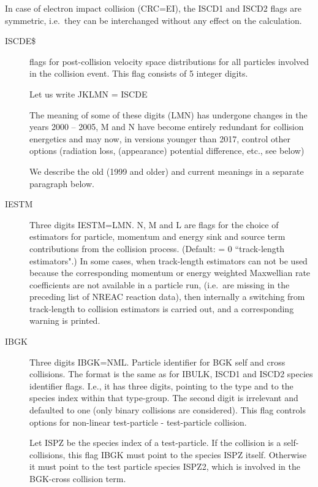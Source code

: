 In case of  electron impact collision (CRC=EI), the ISCD1 and ISCD2 flags are
symmetric, i.e.\ they can be interchanged without any effect on the
calculation.
\begin{description}
  \item[ISCDE\$] flags for post-collision velocity space distributions for all
        particles involved in the collision event.
        This flag consists of 5 integer digits.

        Let us write JKLMN = ISCDE 

        The meaning of some of these digits (LMN) has undergone changes in the years
        2000 -- 2005, M and N have become entirely redundant for collision energetics
        and may now, in versions younger than 2017, control other options (radiation
        loss, (appearance) potential difference, etc., see below) 

        We describe the old (1999 and older) and current meanings in a separate
        paragraph below.

  \item[IESTM] Three digits IESTM=LMN.
        N, M and L are flags for the choice of estimators for particle, momentum and
        energy sink and source term contributions from the collision process.
        (Default: = 0 ``track-length estimators".)
        In some cases, when track-length estimators can not be used because the
        corresponding momentum or energy weighted Maxwellian rate coefficients are not
        available in a particle run, (i.e.\ are missing in the preceding list of NREAC
        reaction data), then internally a switching from track-length to collision
        estimators is carried out, and a corresponding warning is printed.
  \item[IBGK] 

        Three digits IBGK=NML.
        Particle identifier for \ac{BGK} self and cross collisions.
        The format is the same as for IBULK, ISCD1 and ISCD2 species identifier flags.
        I.e., it has three digits, pointing to the type and to the species index within
        that type-group.
        The second digit is irrelevant and defaulted to one (only binary collisions are
        considered).
        This flag controls options for non-linear test-particle - test-particle
        collision.

        Let ISPZ be the species index of a test-particle.
        If the collision is a self-collisions, this flag IBGK must point to the species
        ISPZ itself.
        Otherwise it must point to the  test particle species ISPZ2,
        which is involved in the \acs{BGK}-cross collision term.


\end{description}
